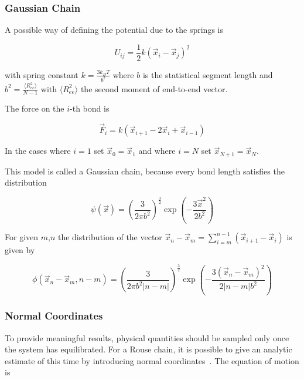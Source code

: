 \documentclass[a4paper]{article}
\begin{document}
\subsubsection{Gaussian Chain}

A possible way of defining the potential due to the springs is

\begin{equation}
U_{ij} = \frac{1}{2} k \left( \vec{x}_{i} - \vec{x}_j \right)^2
\label{eq:rouse_model}
\end{equation}

with spring constant $k = \frac{3 k_B T}{b^2}$ where $b$ is the statistical segment length and $b^2 = \frac{\langle R_{ee}^2 \rangle}{N-1}$ with $\langle R_{ee}^2 \rangle$ the second moment of end-to-end vector.

The force on the $i$-th bond is

\begin{equation}
\vec{F}_i = k \left( \vec{x}_{i+1} - 2 \vec{x}_i + \vec{x}_{i-1} \right)
\label{eq:force-rouse}
\end{equation}

In the cases where $i=1$ set $\vec{x}_0 = \vec{x}_1$ and where $i=N$ set $\vec{x}_{N+1} = \vec{x}_N$. 

This model is called a Gaussian chain, because every bond length satisfies the distribution~\cite{M.Doi1988}

\begin{equation}
\psi(\vec{x}) = \left( \frac{3}{2 \pi b^2} \right)^{\frac{3}{2}} \exp \left(- \frac{3 \vec{x}^2}{2 b^2} \right)
\label{eq:distribution-rouse}
\end{equation}

For given $m$,$n$ the distribution of the vector $\vec{x}_n - \vec{x}_m = \sum_{i=m}^{n-1} (\vec{x}_{i+1} - \vec{x}_i)$ is given by

\begin{equation}
\phi(\vec{x}_n - \vec{x}_m, n-m) = \left( \frac{3}{2 \pi b^2 |n-m|} \right)^{\frac{3}{2}} \exp \left(- \frac{3 (\vec{x}_n - \vec{x}_m)^2}{2 |n-m| b^2} \right)
\label{eq:distribution2-rouse}
\end{equation}

\subsubsection{Normal Coordinates}

To provide meaningful results, physical quantities should be sampled only once the system has equilibrated. For a Rouse chain, it is possible to give an analytic estimate of this time by introducing normal coordinates~\cite{Teraok2002}. The equation of motion is
\end{document}
